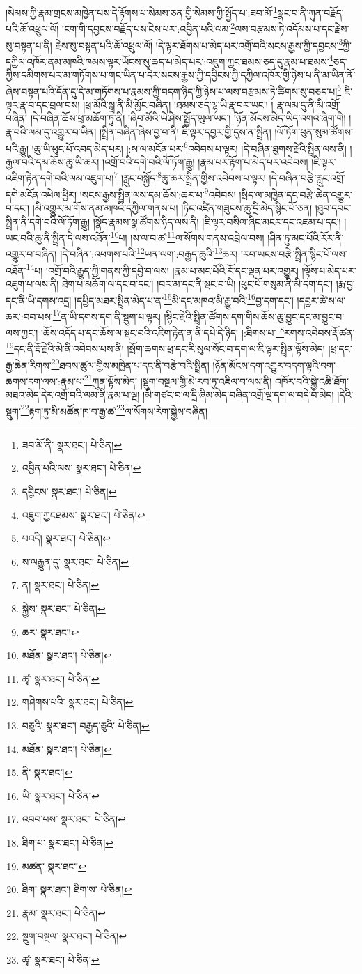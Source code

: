 །སེམས་ཀྱི་རྣམ་གྲངས་མཁྱེན་པས་དེ་རྟོགས་པ་སེམས་ཅན་གྱི་སེམས་ཀྱི་སྤྱོད་པ་:ཟབ་མོ་\footnote{ཟབ་མོ་ནི་  སྣར་ཐང་།  པེ་ཅིན། }སྣང་བ་ནི་ཀུན་བརྗོད་པའི་ཆོ་འཕྲུལ་ལོ། །ངག་གི་དབྱངས་བརྗོད་པས་ངེས་པར་:འབྱིན་པའི་ལམ་\footnote{འབྱིན་པའི་ལས་  སྣར་ཐང་།  པེ་ཅིན། }ལས་བརྩམས་ཏེ་འདོམས་པ་དང་རྗེས་སུ་བསྟན་པ་ནི། རྗེས་སུ་བསྟན་པའི་ཆོ་འཕྲུལ་ལོ། །དེ་ལྟར་ཐོགས་པ་མེད་པར་འགྲོ་བའི་སངས་རྒྱས་ཀྱི་དབྱངས་\footnote{དབྱིངས་  སྣར་ཐང་།  པེ་ཅིན། }ཀྱི་དཀྱིལ་འཁོར་ནམ་མཁའི་ཁམས་ལྟར་ཡོངས་སུ་ཆད་པ་མེད་པར་:འཇུག་ཀྱང་ཐམས་ཅད་དུ་རྣམ་པ་ཐམས་\footnote{འཇུག་ཀྱངཐམས་  སྣར་ཐང་།  པེ་ཅིན། }ཅད་ཀྱིས་དམིགས་པར་མ་གཏོགས་པ་གང་ཡིན་པ་དེར་སངས་རྒྱས་ཀྱི་དབྱིངས་ཀྱི་དཀྱིལ་འཁོར་གྱི་ཉེས་པ་ནི་མ་ཡིན་ནོ་ཞེས་བསྟན་པའི་དོན་དུ་དེ་མ་གཏོགས་པ་རྣམས་ཀྱི་བདག་ཉིད་ཀྱི་ཉེས་པ་ལས་བརྩམས་ཏེ་ཚིགས་སུ་བཅད་པ།\footnote{པའདི།  སྣར་ཐང་།  པེ་ཅིན། } ཇི་ལྟར་རྣ་བ་དང་བྲལ་བས། །ཕྲ་མོའི་སྒྲ་ནི་མི་མྱོང་བཞིན། །ཐམས་ཅད་ལྷ་ཡི་རྣ་བར་ཡང་། །
རྣ་ལམ་དུ་ནི་མི་འགྲོ་བཞིན། །དེ་བཞིན་ཆོས་ཕྲ་མཆོག་ཏུ་ནི། །ཞིབ་མོའི་ཡེ་ཤེས་སྤྱོད་ཡུལ་ཡང་། །ཉོན་མོངས་མེད་ཡིད་འགའ་ཞིག་གི། །རྣ་བའི་ལམ་དུ་འགྱུར་བ་ཡིན། །སྤྲིན་བཞིན་ཞེས་བྱ་བ་ནི། ཇི་ལྟར་དབྱར་གྱི་དུས་ན་སྤྲིན། །ལོ་ཏོག་ཕུན་སུམ་ཚོགས་པའི་རྒྱུ། །ཆུ་ཡི་ཕུང་པོ་འབད་མེད་པར། །:ས་ལ་མངོན་པར་\footnote{ས་ལརྒྱུན་དུ་  སྣར་ཐང་།  པེ་ཅིན། }འབེབས་པ་ལྟར། །དེ་བཞིན་ཐུགས་རྗེའི་སྤྲིན་ལས་ནི། །རྒྱལ་བའི་དམ་ཆོས་ཆུ་ཡི་ཆར། །འགྲོ་བའི་དགེ་བའི་ལོ་ཏོག་རྒྱུ། །རྣམ་པར་རྟོག་པ་མེད་པར་འབེབས། །ཇི་ལྟར་འཇིག་རྟེན་དགེ་བའི་ལམ་འཇུག་པ།\footnote{ན།  སྣར་ཐང་།  པེ་ཅིན། } །རླུང་བསྐྱོད་\footnote{སྐྱེས་  སྣར་ཐང་།  པེ་ཅིན། }ཆུ་ཆར་སྤྲིན་གྱིས་འབེབས་པ་ལྟར། །དེ་བཞིན་བརྩེ་རླུང་འགྲོ་དགེ་མངོན་འཕེལ་ཕྱིར། །སངས་རྒྱས་སྤྲིན་ལས་དམ་ཆོས་:ཆར་པ་\footnote{ཆར་  སྣར་ཐང་། }འབེབས། །སྲིད་ལ་མཁྱེན་དང་བརྩེ་ཆེན་འགྱུར་བ་དང་། །མི་འགྱུར་མ་གོས་ནམ་མཁའི་དཀྱིལ་གནས་པ། །ཏིང་འཛིན་གཟུངས་ཆུ་དྲི་མེད་སྙིང་པོ་ཅན། །ཐུབ་དབང་སྤྲིན་ནི་དགེ་བའི་ལོ་ཏོག་རྒྱུ། །སྣོད་རྣམས་སྣ་ཚོགས་ཉིད་ལས་ནི། །ཇི་ལྟར་བསིལ་ཞིང་མངར་དང་འཇམ་པ་དང་། །ཡང་བའི་ཆུ་ནི་སྤྲིན་དེ་ལས་འཐོན་\footnote{མཐོན་  སྣར་ཐང་།  པེ་ཅིན། }པ། །ས་ལ་བ་ཚ་\footnote{ཚྭ་  སྣར་ཐང་།  པེ་ཅིན། }ལ་སོགས་གནས་འབྲེལ་བས། །ཤིན་ཏུ་མང་པོའི་རོར་ནི་འགྱུར་བ་བཞིན། །དེ་བཞིན་:འཕགས་པའི་\footnote{གཤེགས་པའི་  སྣར་ཐང་།  པེ་ཅིན། }ཡན་ལག་:བརྒྱད་ཆུའི་\footnote{བཅུའི་  སྣར་ཐང་། བརྒྱད་ཅུའི་  པེ་ཅིན། }ཆར། །རབ་ཡངས་བརྩེ་སྤྲིན་སྙིང་པོ་ལས་འཐོན་\footnote{མཐོན་  སྣར་ཐང་།  པེ་ཅིན། }པ། །འགྲོ་བའི་རྒྱུད་ཀྱི་གནས་ཀྱི་དབྱེ་བ་ལས། །རྣམ་པ་མང་པོའི་རོ་དང་ལྡན་པར་འགྱུར། །ལྟོས་པ་མེད་པར་འཇུག་པ་ལས་ནི། ཐེག་པ་མཆོག་ལ་དང་བ་དང་། །བར་མ་དང་ནི་སྡང་བ་ཡི། །ཕུང་པོ་གསུམ་ནི་མི་དག་དང་། །རྨ་བྱ་དང་ནི་ཡི་དགས་འདྲ། །དཔྱིད་མཐར་སྤྲིན་མེད་པ་ན་\footnote{ནི་  སྣར་ཐང་། }མི་དང་མཁའ་མི་རྒྱུ་བའི་\footnote{ཡི་  སྣར་ཐང་།  པེ་ཅིན། }བྱ་དག་དང་། །དབྱར་ཚེ་ས་ལ་ཆར་:བབ་པས་\footnote{འབབ་པས་  སྣར་ཐང་།  པེ་ཅིན། }ན་ཡི་དགས་དག་ནི་སྡུག་པ་ལྟར། །སྙིང་རྗེའི་སྤྲིན་ཚོགས་དག་གིས་ཆོས་ཆུ་བྱུང་དང་མ་བྱུང་བ་ལས་ཀྱང་། །ཆོས་འདོད་པ་དང་ཆོས་ལ་སྡང་བའི་འཇིག་རྟེན་ན་ནི་དཔེ་དེ་ཉིད། །:ཐིགས་པ་\footnote{ཐིག་པ་  སྣར་ཐང་།  པེ་ཅིན། }རགས་འབེབས་རྡོ་ཚན་\footnote{མཚན་  སྣར་ཐང་། }དང་ནི་རྡོ་རྗེའི་མེ་ནི་འབེབས་པས་ནི། །སྲོག་ཆགས་ཕྲ་དང་རི་སུལ་སོང་བ་དག་ལ་ཇི་ལྟར་སྤྲིན་ལྟོས་མེད། །ཕྲ་དང་རྒྱ་ཆེན་རིགས་\footnote{ཐིག་  སྣར་ཐང་། ཐིག་ས་  པེ་ཅིན། }ཐབས་ཚུལ་གྱིས་མཁྱེན་པ་དང་ནི་བརྩེ་བའི་སྤྲིན། །ཉོན་མོངས་དག་འགྱུར་བདག་ལྟའི་བག་ཆགས་དག་ལས་:རྣམ་པ་\footnote{རྣམ་  སྣར་ཐང་།  པེ་ཅིན། }ཀུན་ལྟོས་མེད། །སྡུག་བསྔལ་གྱི་མེ་རབ་ཏུ་འཇིལ་བ་ལས་ནི། འཁོར་བའི་སྐྱེ་འཆི་ཐོག་མཐའ་མེད་དེར་འགྲོ་བའི་ལམ་ནི་རྣམ་པ་ལྔ། །མི་གཙང་བ་ལ་དྲི་ཞིམ་མེད་བཞིན་འགྲོ་ལྔ་དག་ལ་བདེ་བ་མེད། །དེའི་སྡུག་\footnote{སྡུག་བསྔལ་  སྣར་ཐང་།  པེ་ཅིན། }རྟག་ཏུ་མི་མཚོན་ཁ་བ་རྒྱ་ཚ་\footnote{ཚྭ་  སྣར་ཐང་།  པེ་ཅིན། }ལ་སོགས་རེག་སྐྱེས་བཞིན། 